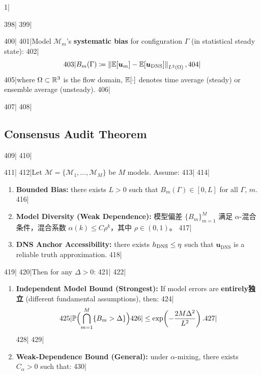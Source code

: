 1|\documentclass[11pt,a4paper]{article}
\begin{document}
398|
399|\begin{definition}
400|\label{def:bias}
401|Model $\mathcal{M}_m$'s \textbf{systematic bias} for configuration $\Gamma$ (in statistical steady state):
402|\begin{equation}\label{eq:bias_def}
403|  B_m(\Gamma) \coloneqq \left\lVert\mathbb{E}[\bm{u}_m] - \mathbb{E}[\bm{u}_{\text{DNS}}]\right\rVert_{L^2(\Omega)},
404|\end{equation}
405|where $\Omega \subset \mathbb{R}^3$ is the flow domain, $\mathbb{E}[\cdot]$ denotes time average (steady) or ensemble average (unsteady).
406|\end{definition}
407|
408|\subsection{Consensus Audit Theorem}
409|
410|\begin{theorem}
411|\label{thm:audit}
412|Let $\mathscr{M} = \{\mathcal{M}_1, \dots, \mathcal{M}_M\}$ be $M$ models. Assume:
413|
414|\begin{enumerate}[label=(A\arabic*),leftmargin=*]
415|  \item \textbf{Bounded Bias: } there exists $L > 0$ such that $B_m(\Gamma) \in [0, L]$ for all $\Gamma$, $m$.
416|  \item \textbf{Model Diversity (Weak Dependence): } 模型偏差 $\{B_m\}_{m=1}^{M}$ 满足 $\alpha$-混合条件，混合系数 $\alpha(k) \leq C \rho^k$，其中 $\rho \in (0, 1)$。
417|  \item \textbf{DNS Anchor Accessibility: } there exists $h_{\text{DNS}} \leq \eta$ such that $\bm{u}_{\text{DNS}}$ is a reliable truth approximation.
418|\end{enumerate}
419|
420|Then for any $\Delta > 0$:
421|
422|\begin{enumerate}[label=(\roman*),leftmargin=*]
423|  \item \textbf{Independent Model Bound (Strongest): } If model errors are \textbf{entirely独立} (different fundamental assumptions), then:
424|  \begin{equation}\label{eq:audit_independent}
425|    \mathbb{P}\Bigl(\bigcap_{m=1}^{M} \{B_m > \Delta\}\Bigr)
426|    \leq \exp\!\left(-\frac{2M\Delta^2}{L^2}\right).
427|  \end{equation}
428|
429|  \item \textbf{Weak-Dependence Bound (General): } under $\alpha$-mixing, there exists $C_{\alpha} > 0$ such that:
430|  \begin{equation}\label{eq:audit_mixing}

\end{equation}
\end{enumerate}
\end{theorem}
\end{document}
